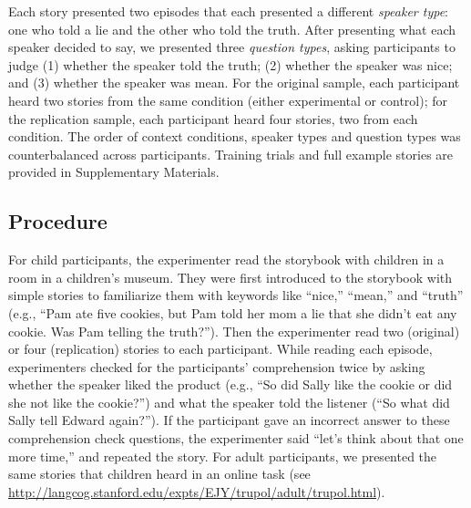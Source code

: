 \documentclass[oneside]{report}
\begin{document}
Each story presented two episodes that each presented a different
\emph{speaker type}: one who told a lie and the other who told the
truth. After presenting what each speaker decided to say, we presented
three \emph{question types}, asking participants to judge (1) whether
the speaker told the truth; (2) whether the speaker was nice; and (3)
whether the speaker was mean. For the original sample, each participant
heard two stories from the same condition (either experimental or
control); for the replication sample, each participant heard four
stories, two from each condition. The order of context conditions,
speaker types and question types was counterbalanced across
participants. Training trials and full example stories are provided in
Supplementary Materials.

\subsection{Procedure}\label{procedure-3}

For child participants, the experimenter read the storybook with
children in a room in a children's museum. They were first introduced to
the storybook with simple stories to familiarize them with keywords like
``nice,'' ``mean,'' and ``truth'' (e.g., ``Pam ate five cookies, but Pam
told her mom a lie that she didn't eat any cookie. Was Pam telling the
truth?''). Then the experimenter read two (original) or four
(replication) stories to each participant. While reading each episode,
experimenters checked for the participants' comprehension twice by
asking whether the speaker liked the product (e.g., ``So did Sally like
the cookie or did she not like the cookie?'') and what the speaker told
the listener (``So what did Sally tell Edward again?''). If the
participant gave an incorrect answer to these comprehension check
questions, the experimenter said ``let's think about that one more
time,'' and repeated the story. For adult participants, we presented the
same stories that children heard in an online task (see
\url{http://langcog.stanford.edu/expts/EJY/trupol/adult/trupol.html}).
\end{document}
